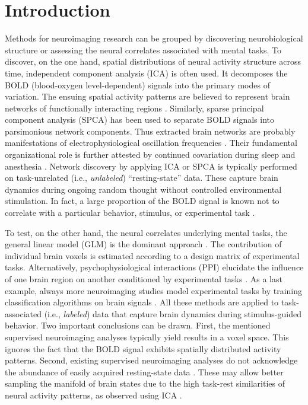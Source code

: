 \documentclass{article} %
\begin{document}
\section{Introduction}
%
Methods for neuroimaging research can be grouped by discovering
neurobiological structure or assessing the neural correlates associated
with mental tasks.
To discover, on the one hand, spatial distributions of neural activity
structure across time,
independent component analysis (ICA) \cite{beckmann2005} is often used.
It decomposes the BOLD (blood-oxygen level-dependent) signals into the
primary modes of variation.
The ensuing spatial activity patterns are believed to represent
brain networks of
functionally interacting regions \cite{smith2009}.
Similarly, sparse principal component analysis (SPCA) \cite{varoqu2011}
has been used to
separate BOLD signals into parsimonious network components.
Thus extracted brain networks are probably
manifestations of electrophysiological oscillation frequencies \cite{hipp15}.
Their fundamental organizational role is further
attested by continued covariation during sleep and anesthesia \cite{fox07}.
%
Network discovery by applying ICA or SPCA is typically performed on
task-unrelated (i.e., \textit{unlabeled}) ``resting-state'' data.
These capture brain dynamics
during ongoing random thought without controlled environmental stimulation.
In fact, a large proportion of the BOLD signal is known
not to correlate with a particular behavior, stimulus, or experimental task
\cite{fox07}. 

To test, on the other hand,
the neural correlates underlying mental tasks,
the general linear model (GLM) is the dominant approach \cite{friston94}.
The contribution of
individual brain voxels is estimated
according to a design matrix of experimental tasks.
Alternatively, psychophysiological interactions (PPI)
elucidate the influence of one brain region on another conditioned
by experimental tasks \cite{friston97}.
As a last example, always more neuroimaging studies model
experimental tasks by training classification algorithms on brain signals
\cite{poldrack09decoding}.
All these methods are applied to task-associated (i.e., \textit{labeled})
data that capture brain dynamics
during stimulus-guided behavior.
Two important conclusions can be drawn.
First, the mentioned supervised neuroimaging analyses typically yield
results in a voxel space.
This ignores the fact that the BOLD
signal exhibits spatially distributed activity patterns.
%
Second, existing supervised neuroimaging analyses
do not acknowledge the abundance
of easily acquired resting-state data \cite{biswaldiscovery}.
These may allow better sampling the manifold of brain states
due to the high task-rest similarities of neural activity patterns,
as observed using ICA \cite{smith2009}.
\end{document}
